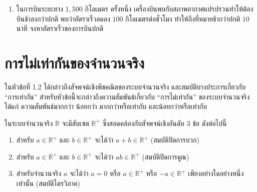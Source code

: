 \begin{enumerate}[label=\arabic*., leftmargin=*, itemsep=0.6em]
\begin{multicols}{2}
\begin{enumerate}[label=\theenumi\arabic*), leftmargin=*, itemsep=0.6em]
		\item $\dfrac{4x-1}{(x+3)(x-5)}
		= \dfrac{A}{x+3}
		+ \dfrac{B}{x-5}$
		
		\item $\dfrac{2x^3+5x^2-x+6}{x^3+x}
		= 2+\dfrac{A}{x}
		+\dfrac{Bx+C}{x^2+1}$
		
		\item $\dfrac{x^2+4x+7}{x(x^2+4)}
		= \dfrac{A}{x}
		+ \dfrac{Bx+C}{x^2+4}$
		
		\item $\dfrac{3x^2+8x-15}{x(x-3)(x+2)}
		= \dfrac{A}{x}
		+ \dfrac{B}{x-3}
		+ \dfrac{C}{x+2}$
		
		\item $\dfrac{Ax+B}{x^2-7x+C}
		= \dfrac{5}{x-3}
		+ \dfrac{4}{x-4}$
	\end{enumerate}
\end{multicols}
\item ในการบินระยะทาง $1,500$ กิโลเมตร ครั้งหนึ่ง เครื่องบินพบกับสภาพอากาศแปรปรวนทำให้ต้องบินช้าลงกว่าปกติ พบว่าอัตราเร็วลดลง $100$ กิโลเมตรต่อชั่วโมง ทำให้ถึงที่หมายช้ากว่าปกติ $10$ นาที จงหาอัตราเร็วของการบินปกติ
\end{enumerate}

\newpage
\section{การไม่เท่ากันของจำนวนจริง}

ในหัวข้อที่ 1.2 ได้กล่าวถึงสัจพจน์เชิงพีชคณิตของระบบจำนวนจริง และสมบัติบางประการเกี่ยวกับ ``การเท่ากัน'' สำหรับหัวข้อนี้จะกล่าวถึงความสัมพันธ์เกี่ยวกับ ``การไม่เท่ากัน'' ของระบบจำนวนจริง ได้แก่ ความสัมพันธ์มากกว่า น้อยกว่า มากกว่าหรือเท่ากับ และน้อยกว่าหรือเท่ากับ

\begin{remarkbox}
ในระบบจำนวนจริง $\mathbb{R}$ จะมีสับเซต $\mathbb{R}^{+}$ ซึ่งสอดคล้องกับสัจพจน์เชิงอันดับ $3$ ข้อ ดังต่อไปนี้
	\begin{enumerate}[label=\arabic*., leftmargin=2em, itemsep=0.5em]
		\item สำหรับ $a \in \mathbb{R}^{+}$ และ $b \in \mathbb{R}^{+}$ จะได้ว่า $a+b \in \mathbb{R}^{+}$ (สมบัติปิดการบวก)
		\item สำหรับ $a \in \mathbb{R}^{+}$ และ $b \in \mathbb{R}^{+}$ จะได้ว่า $ab \in \mathbb{R}^{+}$ (สมบัติปิดการคูณ)
		\item สำหรับจำนวนจริง $a$ จะได้ว่า $a = 0$ หรือ $a \in \mathbb{R}^{+}$ หรือ $-a \in \mathbb{R}^{+}$ เพียงอย่างใดอย่างหนึ่งเท่านั้น (สมบัติไตรวิภาค)
	\end{enumerate}
\end{remarkbox}

